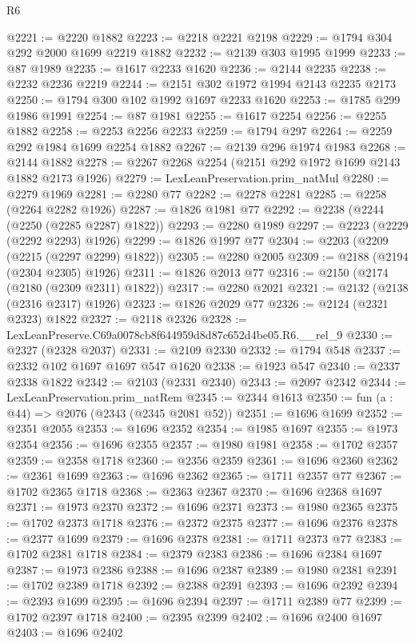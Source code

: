 \begin{lexlean}{R6}
\begin{coremodule}
@2221 := @2220 @1882
@2223 := @2218 @2221 @2198
@2229 := @1794 @304 @292 @2000 @1699 @2219 @1882
@2232 := @2139 @303 @1995 @1999
@2233 := @87 @1989
@2235 := @1617 @2233 @1620
@2236 := @2144 @2235
@2238 := @2232 @2236 @2219
@2244 := @2151 @302 @1972 @1994 @2143 @2235 @2173
@2250 := @1794 @300 @102 @1992 @1697 @2233 @1620
@2253 := @1785 @299 @1986 @1991
@2254 := @87 @1981
@2255 := @1617 @2254
@2256 := @2255 @1882
@2258 := @2253 @2256 @2233
@2259 := @1794 @297
@2264 := @2259 @292 @1984 @1699 @2254 @1882
@2267 := @2139 @296 @1974 @1983
@2268 := @2144 @1882
@2278 := @2267 @2268 @2254 (@2151 @292 @1972 @1699 @2143 @1882 @2173 @1926)
@2279 := LexLeanPreservation.prim_natMul
@2280 := @2279 @1969
@2281 := @2280 @77
@2282 := @2278 @2281
@2285 := @2258 (@2264 @2282 @1926)
@2287 := @1826 @1981 @77
@2292 := @2238 (@2244 (@2250 (@2285 @2287) @1822))
@2293 := @2280 @1989
@2297 := @2223 (@2229 (@2292 @2293) @1926)
@2299 := @1826 @1997 @77
@2304 := @2203 (@2209 (@2215 (@2297 @2299) @1822))
@2305 := @2280 @2005
@2309 := @2188 (@2194 (@2304 @2305) @1926)
@2311 := @1826 @2013 @77
@2316 := @2150 (@2174 (@2180 (@2309 @2311) @1822))
@2317 := @2280 @2021
@2321 := @2132 (@2138 (@2316 @2317) @1926)
@2323 := @1826 @2029 @77
@2326 := @2124 (@2321 @2323) @1822
@2327 := @2118 @2326
@2328 := LexLeanPreserve.C69a0078cb8f644959d8d87c652d4be05.R6.__rel_9
@2330 := @2327 (@2328 @2037)
@2331 := @2109 @2330
@2332 := @1794 @548
@2337 := @2332 @102 @1697 @1697 @547 @1620
@2338 := @1923 @547
@2340 := @2337 @2338 @1822
@2342 := @2103 (@2331 @2340)
@2343 := @2097 @2342
@2344 := LexLeanPreservation.prim_natRem
@2345 := @2344 @1613
@2350 := fun (a : @44) => @2076 (@2343 (@2345 @2081 @52))
@2351 := @1696 @1699
@2352 := @2351 @2055
@2353 := @1696 @2352
@2354 := @1985 @1697
@2355 := @1973 @2354
@2356 := @1696 @2355
@2357 := @1980 @1981
@2358 := @1702 @2357
@2359 := @2358 @1718
@2360 := @2356 @2359
@2361 := @1696 @2360
@2362 := @2361 @1699
@2363 := @1696 @2362
@2365 := @1711 @2357 @77
@2367 := @1702 @2365 @1718
@2368 := @2363 @2367
@2370 := @1696 @2368 @1697
@2371 := @1973 @2370
@2372 := @1696 @2371
@2373 := @1980 @2365
@2375 := @1702 @2373 @1718
@2376 := @2372 @2375
@2377 := @1696 @2376
@2378 := @2377 @1699
@2379 := @1696 @2378
@2381 := @1711 @2373 @77
@2383 := @1702 @2381 @1718
@2384 := @2379 @2383
@2386 := @1696 @2384 @1697
@2387 := @1973 @2386
@2388 := @1696 @2387
@2389 := @1980 @2381
@2391 := @1702 @2389 @1718
@2392 := @2388 @2391
@2393 := @1696 @2392
@2394 := @2393 @1699
@2395 := @1696 @2394
@2397 := @1711 @2389 @77
@2399 := @1702 @2397 @1718
@2400 := @2395 @2399
@2402 := @1696 @2400 @1697
@2403 := @1696 @2402

\end{coremodule}
\end{lexlean}
